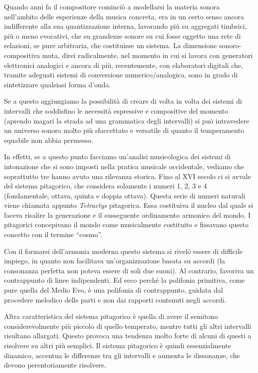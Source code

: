 Quando anni fa il compositore cominciò a modellarsi la materia sonora
nell'ambito delle esperienze della musica concreta, era in un certo senso
ancora indifferente alla sua quantizzazione interna, lavorando più su aggregati
timbrici, più o meno evocativi, che su grandezze sonore su cui fosse oggetto una
rete di relazioni, se pure arbitraria, che costituisse un sistema. La dimensione
sonoro-compositiva muta, direi radicalmente, nel momento in cui si lavora con
generatori elettronici analogici e ancora di più, recentemente, con elaboratori
digitali che, tramite adeguati sistemi di conversione numerico/analogica, sono
in grado di sintetizzare qualsiasi forma d'onda.

Se a questo aggiungiamo la possibilità di creare di volta in volta dei sistemi
di intervalli che soddisfino le necessità espressive e compositive del momento
(aprendo magari la strada ad una grammatica degli intervalli) si può intravedere
un universo sonoro molto più sfaccettato e versatile di quanto il temperamento
equabile non abbia permesso.

In effetti, se a questo punto facciamo un'analisi musicologica dei sistemi di
intonazione che si sono imposti nella pratica musicale occidentale, vediamo che
soprattutto tre hanno avuto una rilevanza storica. Fino al XVI secolo ci si
avvale del sistema pitagorico, che considera solamente i numeri 1, 2, 3 e 4
(fondamentale, ottava, quinta e doppia ottava). Questa serie di numeri naturali
viene chiamata appunto \emph{Tetractys} pitagorica. Essa costituiva il nucleo
dal quale si faceva risalire la generazione e il susseguente ordinamento
armonico del mondo. I pitagorici concepivano il mondo come musicalmente
costituito e fissavano questo concetto con il termine \enquote{cosmo}.

Con il formarsi dell'armonia moderna questo sistema si rivelò essere di
difficile impiego, in quanto non facilitava un'organizzazione basata su accordi
(la consonanza perfetta non poteva essere di soli due suoni). Al contrario,
favoriva un contrappunto di linee indipendenti. Ed ecco perché la polifonia
primitiva, come pure quella del Medio Evo, è una polifonia di contrappunto,
guidata dal procedere melodico delle parti e non dai rapporti contenuti negli
accordi.

Altra caratteristica del sistema pitagorico è quella di avere il semitono
considerevolmente più piccolo di quello temperato, mentre tutti gli altri
intervalli risultano allargati. Questo provoca una tendenza molto forte di
alcuni di questi a risolvere su altri più semplici. Il sistema pitagorico è
quindi essenzialmente dinamico, accentua le differenze tra gli intervalli e
aumenta le dissonanze, che devono perentoriamente risolvere.

